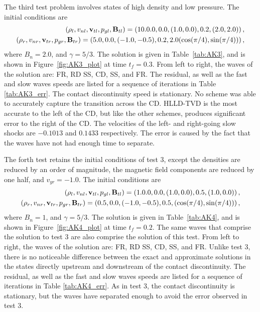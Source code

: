 The third test problem involves states of high density and low pressure.  The initial conditions are
\begin{gather}
\begin{split}
\label{eqn:AK3_init}
(\rho_l,v_{nl},\mathbf{v}_{tl},p_{gl},\mathbf{B}_{tl})= \left(10.0.0,0.0,(1.0,0.0),0.2,(2.0,2.0)\right), \\
(\rho_r,v_{nr},\mathbf{v}_{tr},p_{gr},\mathbf{B}_{tr}) = \left(5.0,0.0,(-1.0,-0.5),0.2,2.0(\cos(\pi/4),\sin(\pi/4))\right),
\end{split}
\end{gather}
where $B_n = 2.0$, and $\gamma=5/3$.  The solution is given in Table~\ref{tab:AK3}, and is shown in Figure~\ref{fig:AK3_plot} at time $t_f=0.3$.  From left to right, the waves of the solution are: FR, RD SS, CD, SS, and FR.  The residual, as well as the fast and slow waves speeds are listed for a sequence of iterations in Table \ref{tab:AK3_err}.  The contact discontinuity speed is stationary.  No scheme was able to accurately capture the transition across the CD.  HLLD-TVD is the most accurate to the left of the CD, but like the other schemes, produces significant error to the right of the CD.  The velocities of the left- and right-going slow shocks are $-0.1013$ and $0.1433$ respectively.  The error is caused by the fact that the waves have not had enough time to separate.

The forth test retains the initial conditions of test 3, except the densities are reduced by an order of magnitude, the magnetic field components are reduced by one half, and $v_{yr} = -1.0$.  The initial conditions are
\begin{gather}
\begin{split}
\label{eqn:AK4_init}
(\rho_l,v_{nl},\mathbf{v}_{tl},p_{gl},\mathbf{B}_{tl})= \left(1.0.0,0.0,(1.0,0.0),0.5,(1.0, 0.0)\right), \\
(\rho_r,v_{nr},\mathbf{v}_{tr},p_{gr},\mathbf{B}_{tr}) = \left(0.5,0.0,(-1.0,-0.5),0.5,(\cos(\pi/4),\sin(\pi/4))\right),
\end{split}
\end{gather}
where $B_n = 1$, and $\gamma=5/3$.  The solution is given in Table~\ref{tab:AK4}, and is shown in Figure~\ref{fig:AK4_plot} at time $t_f=0.2$.  The same waves that comprise the solution to test 3 are also comprise the solution of this test. From left to right, the waves of the solution are: FR, RD SS, CD, SS, and FR.  Unlike test 3, there is no noticeable difference between the exact and approximate solutions in the states directly upstream and downstream of the contact discontinuity.  The residual, as well as the fast and slow waves speeds are listed for a sequence of iterations in Table \ref{tab:AK4_err}.  As in test 3, the contact discontinuity is stationary, but the waves have separated enough to avoid the error observed in test 3.

